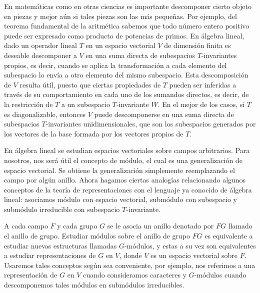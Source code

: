 \documentclass[12pt]{book}
\theoremstyle{definition}
\newcounter{in}
\newcounter{ini}
\begin{document}
En matemáticas como en otras ciencias es importante descomponer cierto
objeto en piezas y mejor aún si tales piezas son las más pequeñas. Por
ejemplo, del teorema fundamental de la aritmética sabemos que todo número
entero positivo puede ser expresado como producto de potencias de
primos. %
En álgebra lineal,
dado un operador lineal $T$ en un espacio vectorial $V$ de
dimensión finita es deseable descomponer a $V$ en una suma directa de
subespacios $T$-invariantes propios, es decir, cuando se aplica la
transformación a cada elemento del subespacio lo envía a otro elemento
del mismo subespacio. Esta descomposición de $V$ resulta útil, puesto que ciertas
propiedades de $T$ pueden ser inferidas a través de su comportamiento
en cada uno de los sumandos directos, es decir, de la restricción de
$T$ a un subespacio $T$-invariante $W$.
En el mejor de los casos, si $T$ es diagonalizable, entonces $V$ puede
descomponerse en una suma directa de subespacios $T$-invariantes
unidimensionales, que son los subespacios generados por los vectores
de la base formada por los vectores propios de $T$. 

En álgebra lineal se estudian espacios vectoriales sobre campos
arbitrarios. Para nosotros, nos será útil el concepto de módulo, el cual es una generalización de espacio
vectorial. Se obtiene la generalización simplemente reemplazando el
campo por algún anillo. Ahora hagamos ciertas analogías relacionando
algunos conceptos de la teoría de representaciones con el lenguaje ya
conocido de álgebra lineal: asociamos módulo con espacio vectorial, submódulo con
subespacio y submódulo irreducible con subespacio $T$-invariante.

A cada campo $F$ y cada grupo $G$ se le asocia un anillo denotado por
$FG$ llamado el anillo de grupo. Estudiar módulos sobre el
anillo de grupo $FG$ es equivalente a estudiar nuevas estructuras
llamadas $G$-módulos, y estas a su
vez son equivalentes a estudiar representaciones de $G$ en
$V$, donde $V$ es un espacio vectorial sobre $F$. Usaremos
tales conceptos según sea conveniente, por ejemplo, nos referimos a
una representación de $G$ en $V$ cuando consideramos caracteres y
$G$-módulos cuando descomponemos tales módulos en submódulos
irreducibles. 
\end{document}
